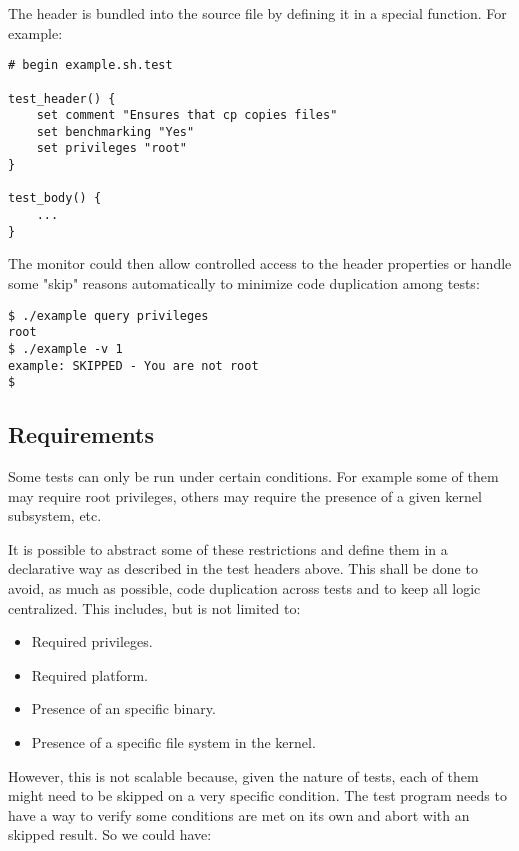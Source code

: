 \documentclass[a4paper,10pt]{article}
\begin{document}
The header is bundled into the source file by defining it in a special
function.  For example:

\begin{verbatim}
# begin example.sh.test

test_header() {
    set comment "Ensures that cp copies files"
    set benchmarking "Yes"
    set privileges "root"
}

test_body() {
    ...
}
\end{verbatim}

The monitor could then allow controlled access to the header properties or
handle some "skip" reasons automatically to minimize code duplication
among tests:

\begin{verbatim}
$ ./example query privileges
root
$ ./example -v 1
example: SKIPPED - You are not root
$
\end{verbatim}


\subsection{Requirements}

Some tests can only be run under certain conditions.  For example some of
them may require root privileges, others may require the presence of a
given kernel subsystem, etc.

It is possible to abstract some of these restrictions and define them
in a declarative way as described in the test headers above.  This shall be
done to avoid, as much as possible, code duplication across tests and to
keep all logic centralized.  This includes, but is not limited to:

\begin{itemize}

\item Required privileges.

\item Required platform.

\item Presence of an specific binary.

\item Presence of a specific file system in the kernel.

\end{itemize}

However, this is not scalable because, given the nature of tests, each
of them might need to be skipped on a very specific condition.  The test
program needs to have a way to verify some conditions are met on its own
and abort with an skipped result.  So we could have:
\end{document}

